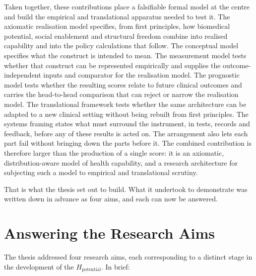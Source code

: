 Taken together, these contributions place a falsifiable formal model at the centre and build the empirical and translational apparatus needed to test it. The axiomatic realisation model specifies, from first principles, how biomedical potential, social enablement and structural freedom combine into realised capability and into the policy calculations that follow. The conceptual model specifies what the construct is intended to mean. The measurement model tests whether that construct can be represented empirically and supplies the outcome-independent inputs and comparator for the realisation model. The prognostic model tests whether the resulting scores relate to future clinical outcomes and carries the head-to-head comparison that can reject or narrow the realisation model. The translational framework tests whether the same architecture can be adapted to a new clinical setting without being rebuilt from first principles. The systems framing states what must surround the instrument, in tests, records and feedback, before any of these results is acted on. The arrangement also lets each part fail without bringing down the parts before it. The combined contribution is therefore larger than the production of a single score: it is an axiomatic, distribution-aware model of health capability, and a research architecture for subjecting such a model to empirical and translational scrutiny.

That is what the thesis set out to build. What it undertook to demonstrate was
written down in advance as four aims, and each can now be answered.

\section{Answering the Research Aims}
\label{sec:aims}

\noindent The thesis addressed four research aims, each corresponding to a distinct stage in the development of the $H_{\text{potential}}$. In brief:

